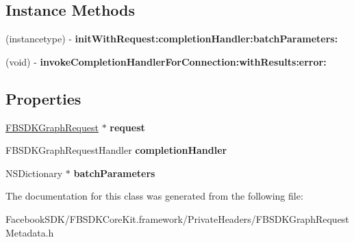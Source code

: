\subsection*{Instance Methods}
\begin{DoxyCompactItemize}
\item 
\hypertarget{interface_f_b_s_d_k_graph_request_metadata_ada584057342899328b3fc0253bb0e365}{(instancetype) -\/ {\bfseries init\-With\-Request\-:completion\-Handler\-:batch\-Parameters\-:}}\label{interface_f_b_s_d_k_graph_request_metadata_ada584057342899328b3fc0253bb0e365}

\item 
\hypertarget{interface_f_b_s_d_k_graph_request_metadata_ab6ad72a0a85d114b379c4f99a0a6a116}{(void) -\/ {\bfseries invoke\-Completion\-Handler\-For\-Connection\-:with\-Results\-:error\-:}}\label{interface_f_b_s_d_k_graph_request_metadata_ab6ad72a0a85d114b379c4f99a0a6a116}

\end{DoxyCompactItemize}
\subsection*{Properties}
\begin{DoxyCompactItemize}
\item 
\hypertarget{interface_f_b_s_d_k_graph_request_metadata_a4e046b44a81057a6fb84688e3ebfe2e3}{\hyperlink{interface_f_b_s_d_k_graph_request}{F\-B\-S\-D\-K\-Graph\-Request} $\ast$ {\bfseries request}}\label{interface_f_b_s_d_k_graph_request_metadata_a4e046b44a81057a6fb84688e3ebfe2e3}

\item 
\hypertarget{interface_f_b_s_d_k_graph_request_metadata_ad1c6d93b4052c339689e8bd31624319a}{F\-B\-S\-D\-K\-Graph\-Request\-Handler {\bfseries completion\-Handler}}\label{interface_f_b_s_d_k_graph_request_metadata_ad1c6d93b4052c339689e8bd31624319a}

\item 
\hypertarget{interface_f_b_s_d_k_graph_request_metadata_ac3cd61f1ef2352993a93418cbf827d7d}{N\-S\-Dictionary $\ast$ {\bfseries batch\-Parameters}}\label{interface_f_b_s_d_k_graph_request_metadata_ac3cd61f1ef2352993a93418cbf827d7d}

\end{DoxyCompactItemize}


The documentation for this class was generated from the following file\-:\begin{DoxyCompactItemize}
\item 
Facebook\-S\-D\-K/\-F\-B\-S\-D\-K\-Core\-Kit.\-framework/\-Private\-Headers/F\-B\-S\-D\-K\-Graph\-Request\-Metadata.\-h\end{DoxyCompactItemize}
